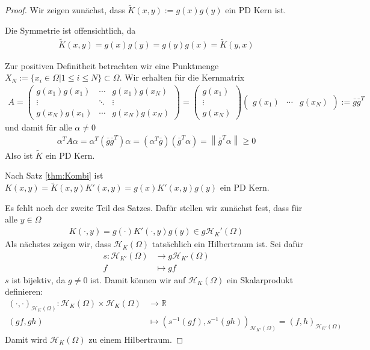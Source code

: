 \begin{proof}
Wir zeigen zunächst, dass $\tilde{K}(x,y):= g(x)g(y)$ ein \ac{PD} Kern ist.

Die Symmetrie ist offensichtlich, da
\begin{align*}
\tilde{K}(x,y)= g(x)g(y) = g(y) g(x) = \tilde{K}(y,x)
\end{align*}

Zur positiven Definitheit betrachten wir eine Punktmenge $X_N := \{x_i \in \Omega| 1 \le i \le N \}\subset \Omega$. Wir erhalten für die Kernmatrix
\begin{align*}
A = 
\begin{pmatrix}
g(x_1)g(x_1) & \cdots & g(x_1)g(x_N) \\ 
\vdots & \ddots & \vdots \\ 
g(x_N)g(x_1) & \cdots & g(x_N)g(x_N)
\end{pmatrix} 
=
\begin{pmatrix}
g(x_1) \\ 
\vdots \\ 
g(x_N)
\end{pmatrix}
\begin{pmatrix}
g(x_1) & \cdots & g(x_N)
\end{pmatrix}
:= \bar{g}\bar{g}^T
\end{align*}
und damit für alle $\alpha \neq 0$
\begin{align*}
\alpha^T A \alpha = \alpha^T \left(\bar{g}\bar{g}^T\right)\alpha = \left(\alpha^T \bar{g}\right)\left(\bar{g}^T \alpha\right) = \left\| \bar{g}^T\alpha\right\| \geq 0
\end{align*}
Also ist $\tilde{K}$ ein \ac{PD} Kern.

Nach Satz \ref{thm:Kombi} ist $K(x,y) = \tilde{K}(x,y) K'(x,y) = g(x) K'(x,y) g(y)$ ein \ac{PD} Kern.

Es fehlt noch der zweite Teil des Satzes. Dafür stellen wir zunächst fest, dass für alle $y \in \Omega$
\begin{align*}
K(\cdot,y) = g(\cdot) K'(\cdot,y) g(y) \in g \mathcal{H}_K' (\Omega)
\end{align*}
Als nächstes zeigen wir, dass $\mathcal{H}_K(\Omega)$ tatsächlich ein Hilbertraum ist. Sei dafür
\begin{align*}
s : \mathcal{H}_{K'} (\Omega) &\rightarrow g\mathcal{H}_{K'} (\Omega)\\
f &\mapsto gf
\end{align*}
$s$ ist bijektiv, da $g \neq 0$ ist. Damit können wir auf $\mathcal{H}_K (\Omega)$ ein Skalarprodukt definieren:
\begin{align*}
\left(\cdot, \cdot \right)_{\mathcal{H}_K(\Omega)} : \mathcal{H}_K(\Omega) \times \mathcal{H}_K(\Omega) &\rightarrow \mathbb{R}\\
(gf, gh) &\mapsto \left(s^{-1}(gf), s^{-1}(gh)\right)_{\mathcal{H}_{K'}(\Omega)} = \left( f,h \right)_{\mathcal{H}_{K'}(\Omega)}
\end{align*}
Damit wird $\mathcal{H}_K(\Omega)$ zu einem Hilbertraum. 


\end{proof}
